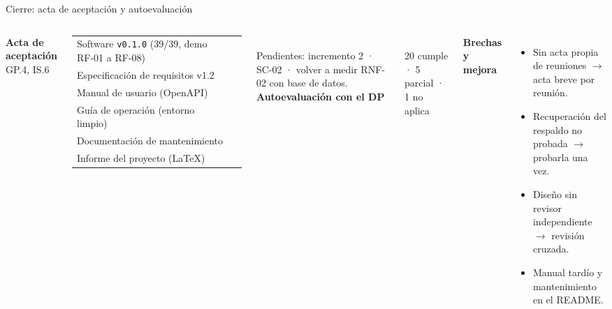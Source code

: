 \documentclass[aspectratio=169,11pt]{beamer}
\newcommand{\si}{\textcolor{verdeespe}{\ding{51}}}
\newcommand{\cod}[1]{\texttt{\small #1}}
\newcommand{\cifra}[2]{\begin{minipage}[t]{0.47\linewidth}\centering{\LARGE\bfseries\color{verdeespe}#1}\\[2pt]{\footnotesize\color{gristexto}#2}\end{minipage}}
\begin{document}
\begin{frame}{Cierre: acta de aceptación y autoevaluación}
\begin{columns}[T,onlytextwidth]
\textbf{Acta de aceptación} \hfill{\scriptsize GP.4, IS.6}\\[0.1cm]
\footnotesize
\begin{tabularx}{\linewidth}{@{}L c@{}}
\toprule
Software \cod{v0.1.0} (39/39, demo RF-01 a RF-08) & \si \\
Especificación de requisitos v1.2 & \si \\
Manual de usuario (OpenAPI) & \si \\
Guía de operación (entorno limpio) & \si \\
Documentación de mantenimiento & \si \\
Informe del proyecto (\LaTeX) & \si \\
\bottomrule
\end{tabularx}\\[0.15cm]
{\scriptsize Pendientes: incremento 2 · SC-02 · volver a medir RNF-02 con base de datos.}
\textbf{Autoevaluación con el DP}\\[0.1cm]
\centering
\cifra{90\,\%}{20 cumple · 5 parcial · 1 no aplica}
\vspace{0.2cm}

\raggedright\footnotesize
\textbf{Brechas y mejora}
\begin{itemize}\scriptsize
  \item Sin acta propia de reuniones $\rightarrow$ acta breve por reunión.
  \item Recuperación del respaldo no probada $\rightarrow$ probarla una vez.
  \item Diseño sin revisor independiente $\rightarrow$ revisión cruzada.
  \item Manual tardío y mantenimiento en el README.
\end{itemize}
\end{columns}
\end{frame}
\end{document}
